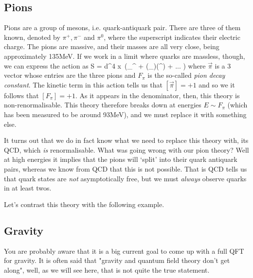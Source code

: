 \subsection{Pions}

Pions are a group of mesons, i.e. quark-antiquark pair. There are three of them known, denoted by $\pi^+,\pi^-$ and $\pi^0$, where the superscript indicates their electric charge. The pions are massive, and their masses are all very close, being approximately 135MeV. If we work in a limit where quarks are massless, though, we can express the action as 
\bse 
    S = \int d^4 x\, \bigg(\p_{\mu}\Vec{\pi}\cdot \p^{\mu}\Vec{\pi} + (\p_{\mu}\Vec{\pi}\cdot \vec{\pi})(\p^{\mu}\Vec{\pi}\cdot\vec{\pi}) + ... \bigg)
\ese 
where $\vec{\pi}$ is a $3$ vector whose entries are the three pions and $F_{\pi}$ is the so-called \textit{pion decay constant}. The kinetic term in this action tells us that $[\vec{\pi}]=+1$ and so we it follows that $[F_{\pi}]=+1$. As it appears in the denominator, then, this theory is non-renormalisable. This theory therefore breaks down at energies $E\sim F_{\pi}$ (which has been measured to be around 93MeV), and we must replace it with something else. 

It turns out that we do in fact know what we need to replace this theory with, its QCD, which \textit{is} renormalisable. What was going wrong with our pion theory? Well at high energies it implies that the pions will `split' into their quark antiquark pairs, whereas we know from QCD that this is not possible. That is QCD tells us that quark states are \textit{not} asymptotically free, but we must \textit{always} observe quarks in at least twos. 

Let's contrast this theory with the following example. 

\subsection{Gravity}

You are probably aware that it is a big current goal to come up with a full QFT for gravity. It is often said that "gravity and quantum field theory don't get along", well, as we will see here, that is not quite the true statement. 

